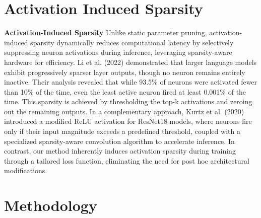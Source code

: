 \documentclass[10pt,twocolumn]{article}
\begin{document}
\section{Activation Induced Sparsity}

\textbf{Activation-Induced Sparsity} Unlike static parameter pruning, activation-induced sparsity dynamically reduces computational latency by selectively suppressing neuron activations during inference, leveraging sparsity-aware hardware for efficiency. Li et al. (2022) demonstrated that larger language models exhibit progressively sparser layer outputs, though no neuron remains entirely inactive. Their analysis revealed that while 93.5\% of neurons were activated fewer than 10\% of the time, even the least active neuron fired at least 0.001\% of the time. This sparsity is achieved by thresholding the top-k activations and zeroing out the remaining outputs. In a complementary approach, Kurtz et al. (2020) introduced a modified ReLU activation for ResNet18 models, where neurons fire only if their input magnitude exceeds a predefined threshold, coupled with a specialized sparsity-aware convolution algorithm to accelerate inference. In contrast, our method inherently induces activation sparsity during training through a tailored loss function, eliminating the need for post hoc architectural modifications.




\section{Methodology}
\end{document}
